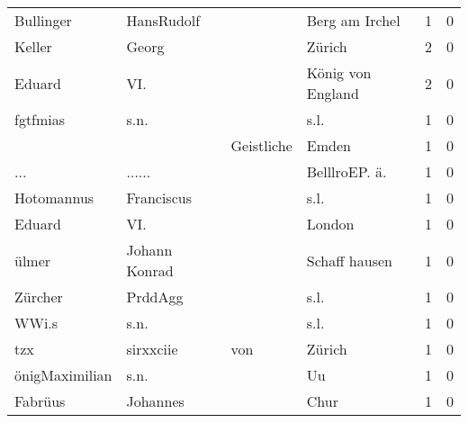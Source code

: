 \begin{center}
\begin{tiny}
\begin{longtabu}{llllrr}
                Bullinger &                         HansRudolf &             &                              Berg am Irchel &          1 &         0 \\
                   Keller &                              Georg &             &                                      Zürich &          2 &         0 \\
                   Eduard &                                VI. &             &                           König von England &          2 &         0 \\
                 fgtfmias &                               s.n. &             &                                        s.l. &          1 &         0 \\
                          &                                    &  Geistliche &                                       Emden &          1 &         0 \\
                      ... &                             ...... &             &                              BelllroEP. ä.  &          1 &         0 \\
               Hotomannus &                         Franciscus &             &                                        s.l. &          1 &         0 \\
                   Eduard &                                VI. &             &                                      London &          1 &         0 \\
                    ülmer &                      Johann Konrad &             &                               Schaff hausen &          1 &         0 \\
                  Zürcher &                            PrddAgg &             &                                        s.l. &          1 &         0 \\
                    WWi.s &                               s.n. &             &                                        s.l. &          1 &         0 \\
                      tzx &                          sirxxciie &         von &                                      Zürich &          1 &         0 \\
           önigMaximilian &                               s.n. &             &                                          Uu &          1 &         0 \\
                  Fabrüus &                           Johannes &             &                                        Chur &          1 &         0 \\

\end{longtabu}
\end{tiny}
\end{center}
